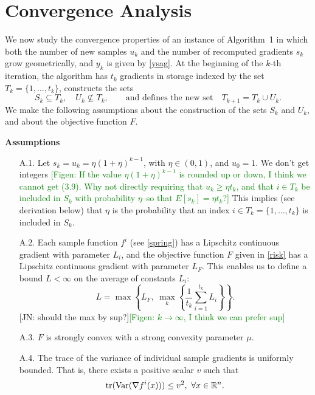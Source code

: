 \documentclass[11pt]{article}
\begin{document}
\section{Convergence Analysis}  \label{analysis}
\setcounter{equation}{0}

We now study the convergence properties of an instance of Algorithm~1 in which both the number of new samples $u_k$ and the number of recomputed gradients $s_k$ grow geometrically, and $y_k$ is given by \eqref{ysag}. At the beginning of the $k$-th iteration, the algorithm has $t_k$ gradients in storage indexed by the set $T_k= \{1, \ldots, t_k\}$, constructs the sets
\begin{equation}  \label{capusu}
      S_k \subseteq T_k, \quad U_k \not \subseteq T_k ,\qquad\mbox{and defines the new set} \quad   T_{k+1}= T_k \cup U_k.
\end{equation}
We make the following assumptions about the construction of the sets $S_k$ and $U_k$, and about the objective function $F$.

 
 \bigskip

\noindent\textbf{Assumptions}

\begin{itemize}
 \item[    A.1.] Let $s_k=u_k=\eta (1+\eta)^{k-1}$, with $\eta \in (0,1)$, and $u_0=1$. {\color{red} We don't get integers} \textcolor{green}{[Figen: If the value $\eta (1+\eta)^{k-1}$ is rounded up or down, I think we cannot get (3.9).  Why not directly requiring that $u_k\geq \eta t_k$, and that $i\in T_k$ be included in $S_k$ with probability $\eta$--so that $E[s_k]=\eta t_k$?]} {\color{blue} This implies (see derivation below) that $\eta$ is the probability that an index $i\in T_k =  \{1,\ldots,t_k\}$ is included in $S_k$.}

 \item[    A.2.] Each sample function $f^i$ (see \eqref{spring}) has a Lipschitz continuous gradient with parameter $L_i$, and  the objective function $F$ given in \eqref{risk} has a Lipschitz continuous gradient with parameter $L_F$. This enables us to define a bound $L<\infty$ on the average of constants $L_i$:
 \begin{equation}\label{eq:L}
  L = \max \left\{L_F, \ \max_k \left\{\frac{1}{t_{k}}\sum_{i=1}^{t_k}L_i\right\}\right\}.
 \end{equation}
 {\color{blue}[JN: should the max by sup?]}\textcolor{green}{[Figen: $k\rightarrow \infty$, I think we can prefer sup]}

 \item[    A.3.] $F$ is strongly convex with a strong convexity parameter $\mu$.
 
 \item[    A.4.] The trace of the variance of individual sample gradients is uniformly bounded. That is, there exists a positive scalar $v$ such that
 \[
   \mbox{tr}({\rm Var} (\nabla f^i(x))) \leq v^2, \ \forall x \in \mathbb{R}^n.
 \]

\end{itemize}
\end{document}
